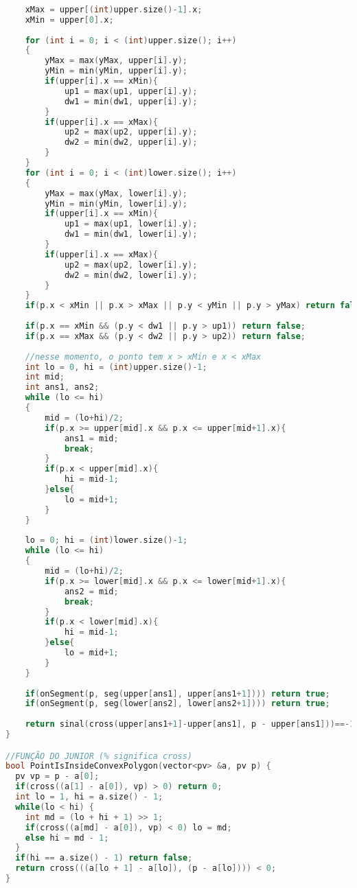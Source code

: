 \documentclass[12pt,a4paper, twoside]{report}
\begin{document}
\begin{lstlisting}[caption=Funções de polígono,language=C++]
    
    xMax = upper[(int)upper.size()-1].x;
    xMin = upper[0].x;
    
    for (int i = 0; i < (int)upper.size(); i++)
    {
        yMax = max(yMax, upper[i].y);
        yMin = min(yMin, upper[i].y);
        if(upper[i].x == xMin){
            up1 = max(up1, upper[i].y);
            dw1 = min(dw1, upper[i].y);
        }
        if(upper[i].x == xMax){
            up2 = max(up2, upper[i].y);
            dw2 = min(dw2, upper[i].y);
        }
    }
    for (int i = 0; i < (int)lower.size(); i++)
    {
        yMax = max(yMax, lower[i].y);
        yMin = min(yMin, lower[i].y);
        if(upper[i].x == xMin){
            up1 = max(up1, lower[i].y);
            dw1 = min(dw1, lower[i].y);
        }
        if(upper[i].x == xMax){
            up2 = max(up2, lower[i].y);
            dw2 = min(dw2, lower[i].y);
        }
    }
    if(p.x < xMin || p.x > xMax || p.y < yMin || p.y > yMax) return false;
    
    if(p.x == xMin && (p.y < dw1 || p.y > up1)) return false;
    if(p.x == xMax && (p.y < dw2 || p.y > up2)) return false;
    
    //nesse momento, o ponto tem x > xMin e x < xMax
    int lo = 0, hi = (int)upper.size()-1;
    int mid;
    int ans1, ans2;
    while (lo <= hi)
    {
        mid = (lo+hi)/2;
        if(p.x >= upper[mid].x && p.x <= upper[mid+1].x){
            ans1 = mid;
            break;
        }
        if(p.x < upper[mid].x){
            hi = mid-1;
        }else{
            lo = mid+1;
        }
    }
    
    lo = 0; hi = (int)lower.size()-1;
    while (lo <= hi)
    {
        mid = (lo+hi)/2;
        if(p.x >= lower[mid].x && p.x <= lower[mid+1].x){
            ans2 = mid;
            break;
        }
        if(p.x < lower[mid].x){
            hi = mid-1;
        }else{
            lo = mid+1;
        }
    }
    
    if(onSegment(p, seg(upper[ans1], upper[ans1+1]))) return true;
    if(onSegment(p, seg(lower[ans2], lower[ans2+1]))) return true;
    
    return sinal(cross(upper[ans1+1]-upper[ans1], p - upper[ans1]))==-1 && sinal(cross(lower[ans2+1] - lower[ans2], p - lower[ans2]))==1;
}

//FUNÇÃO DO JUNIOR (% significa cross)
bool PointIsInsideConvexPolygon(vector<pv> &a, pv p) {
  pv vp = p - a[0];
  if(cross((a[1] - a[0]), vp) > 0) return 0;
  int lo = 1, hi = a.size() - 1;
  while(lo < hi) {
    int md = (lo + hi + 1) >> 1;
    if(cross((a[md] - a[0]), vp) < 0) lo = md;
    else hi = md - 1;
  }
  if(hi == a.size() - 1) return false;
  return cross(((a[lo + 1] - a[lo]), (p - a[lo]))) < 0;
}


\end{lstlisting}
\end{document}
